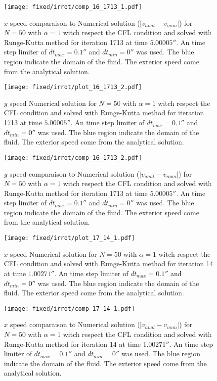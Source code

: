 \begin{figure}
\texttt{[image: fixed/irrot/comp\_16\_1713\_1.pdf]}
\caption{$x$ speed comparaison to Numerical solution ($|v_{anal}-v_{num}|$) for $N=50$ with $\alpha=1$ witch respect the CFL condition and solved with Runge-Kutta method
for iteration 1713 at time $\unit{5.00005}{\second}$.
An time step limiter of $dt_{max}=\unit{0.1}{\second}$ and $dt_{min}=\unit{0}{\second}$ was used.
The blue region indicate the domain of the fluid. The exterior speed come from the analytical solution.
\label{fix:comp_16_1713_1}
}
\end{figure}

\begin{figure}
\texttt{[image: fixed/irrot/plot\_16\_1713\_2.pdf]}
\caption{$y$ speed Numerical solution for $N=50$ with $\alpha=1$ witch respect the CFL condition and solved with Runge-Kutta method
for iteration 1713 at time $\unit{5.00005}{\second}$.
An time step limiter of $dt_{max}=\unit{0.1}{\second}$ and $dt_{min}=\unit{0}{\second}$ was used.
The blue region indicate the domain of the fluid. The exterior speed come from the analytical solution.
\label{fix:plot_16_1713_2}
}
\end{figure}


\begin{figure}
\texttt{[image: fixed/irrot/comp\_16\_1713\_2.pdf]}
\caption{$y$ speed comparaison to Numerical solution ($|v_{anal}-v_{num}|$) for $N=50$ with $\alpha=1$ witch respect the CFL condition and solved with Runge-Kutta method
for iteration 1713 at time $\unit{5.00005}{\second}$.
An time step limiter of $dt_{max}=\unit{0.1}{\second}$ and $dt_{min}=\unit{0}{\second}$ was used.
The blue region indicate the domain of the fluid. The exterior speed come from the analytical solution.
\label{fix:comp_16_1713_2}
}
\end{figure}

\clearpage

\begin{figure}
\texttt{[image: fixed/irrot/plot\_17\_14\_1.pdf]}
\caption{$x$ speed Numerical solution for $N=50$ with $\alpha=1$ witch respect the CFL condition and solved with Runge-Kutta method
for iteration 14 at time $\unit{1.00271}{\second}$.
An time step limiter of $dt_{max}=\unit{0.1}{\second}$ and $dt_{min}=\unit{0}{\second}$ was used.
The blue region indicate the domain of the fluid. The exterior speed come from the analytical solution.
\label{fix:plot_17_14_1}
}
\end{figure}

\begin{figure}
\texttt{[image: fixed/irrot/comp\_17\_14\_1.pdf]}
\caption{$x$ speed comparaison to Numerical solution ($|v_{anal}-v_{num}|$) for $N=50$ with $\alpha=1$ witch respect the CFL condition and solved with Runge-Kutta method
for iteration 14 at time $\unit{1.00271}{\second}$.
An time step limiter of $dt_{max}=\unit{0.1}{\second}$ and $dt_{min}=\unit{0}{\second}$ was used.
The blue region indicate the domain of the fluid. The exterior speed come from the analytical solution.
\label{fix:comp_17_14_1}
}
\end{figure}

